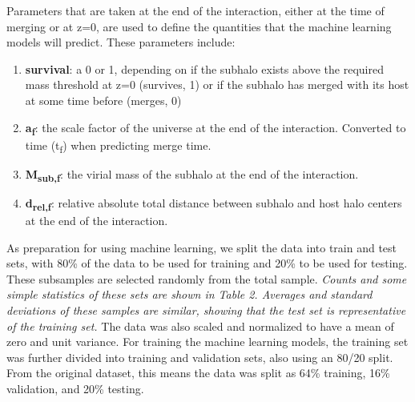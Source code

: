 \documentclass[fleqn,usenatbib]{mnras}
\begin{document}
    Parameters that are taken at the end of the interaction, either at the time of merging or at z=0, are used to define the quantities that the machine learning models will predict. These parameters include:
    
\renewcommand{\theenumi}{\arabic{enumi}}
    \begin{enumerate}
        \item \textbf{survival}: a 0 or 1, depending on if the subhalo exists above the required mass threshold at z=0 (survives, 1) or if the subhalo has merged with its host at some time before (merges, 0)
        \item \textbf{a\textsubscript{f}}: the scale factor of the universe at the end of the interaction. Converted to time (t\textsubscript{f}) when predicting merge time.
        \item \textbf{M\textsubscript{sub,f}}: the virial mass of the subhalo at the end of the interaction.
        \item \textbf{d\textsubscript{rel,f}}: relative absolute total distance between subhalo and host halo centers at the end of the interaction.
    \end{enumerate}
\par
    As preparation for using machine learning, we split the data into train and test sets, with 80\% of the data to be used for training and 20\% to be used for testing. These subsamples are selected randomly from the total sample. \textit{Counts and some simple statistics of these sets are shown in Table 2. Averages and standard deviations of these samples are similar, showing that the test set is representative of the training set.} The data was also scaled and normalized to have a mean of zero and unit variance. For training the machine learning models, the training set was further divided into training and validation sets, also using an 80/20 split. From the original dataset, this means the data was split as 64\% training, 16\% validation, and 20\% testing.
\end{document}
